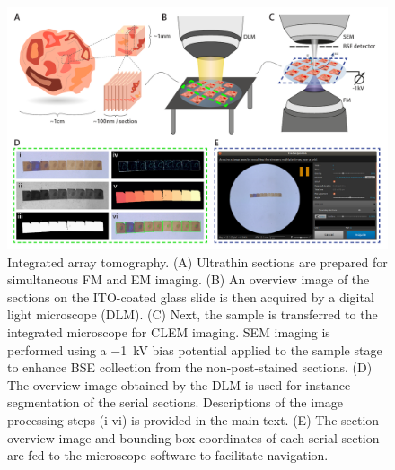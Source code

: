 \begin{figure}[!tb]
    \centering
    \includegraphics[width=\linewidth]{chapter-3/figures_PDF/fig3-1_workflow.pdf}
    \caption{Integrated array tomography.
    (A) Ultrathin sections are prepared for simultaneous FM and EM imaging.
    (B) An overview image of the sections on the ITO-coated glass slide is then acquired by a digital light microscope (DLM).
    (C) Next, the sample is transferred to the integrated microscope for CLEM imaging. SEM imaging is performed using a \SI{-1}{\kilo\volt} bias potential applied to the sample stage to enhance BSE collection from the non-post-stained sections.
    (D) The overview image obtained by the DLM is used for instance segmentation of the serial sections. Descriptions of the image processing steps (i-vi) is provided in the main text.
    (E) The section overview image and bounding box coordinates of each serial section are fed to the microscope software to facilitate navigation.}
    \label{fig:3.1_workflow}
\end{figure}



